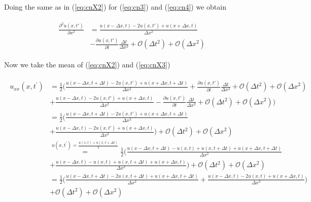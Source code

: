 \documentclass{article}
\begin{document}
Doing the same as in (\ref{eq:cnX2}) for (\ref{eq:cn3}) and (\ref{eq:cn4}) we obtain

\begin{subequations}\label{eq:cnX3}
	\begin{align}
		\begin{split}
			\frac{\partial^2 u(x,t')}{\partial x^2} &=\frac{u(x-\Delta x,t) - 2u(x,t') + u(x+\Delta x, t)}{\Delta x^2}\\
			&- \frac{\partial u(x,t')}{\partial t} \frac{\Delta t}{\Delta x^2} 
			+  \mathcal{O}(\Delta t^2) + \mathcal{O}(\Delta x^2)
		\end{split}
	\end{align}
\end{subequations}

Now we take the mean of (\ref{eq:cnX2}) and (\ref{eq:cnX3}) 

\begin{subequations}
	\begin{align}
		\begin{split}
			u_{xx}(x, t^{'}) &=\frac{1}{2} \Big(\frac{u(x-\Delta x,t+ \Delta t)  - 2u(x,t') +  	u(x+\Delta x, t+\Delta t)}{\Delta x^2} +\frac{\partial u(x,t')}{\partial t} \frac{\Delta t}{\Delta x^2} + \mathcal{O}(\Delta t^2) + \mathcal{O}(\Delta x^2) \\
			&+  \frac{u(x-\Delta x,t) - 2u(x,t') + u(x+\Delta x, t)}{\Delta x^2} -\frac{\partial u(x,t')}{\partial t} \frac{\Delta t}{\Delta x^2} + \mathcal{O}(\Delta t^2)  + \mathcal{O}(\Delta x^2)\Big)\\
			&= \frac{1}{2} \Big(\frac{u(x-\Delta x,t+ \Delta t)  - 2u(x,t') +  	u(x+\Delta x, t+\Delta t)}{\Delta x^2} \\
			& +  \frac{u(x-\Delta x,t) - 2u(x,t') + u(x+\Delta x, t)}{\Delta x^2} \Big) + \mathcal{O}(\Delta t^2) + \mathcal{O}(\Delta x^2)\\
			&\stackrel{u(x,t^{'}) = \frac{u(x,t) + u(x,t+\Delta t)}{2}}{=}
			\frac{1}{2} \Big(\frac{u(x-\Delta x,t+ \Delta t)  - u(x,t) + u(x,t+\Delta t) +  	u(x+\Delta x, t+\Delta t)}{\Delta x^2} \\
			& +  \frac{u(x-\Delta x,t) - u(x,t) + u(x,t+\Delta t) + u(x+\Delta x, t)}{\Delta x^2} \Big) + \mathcal{O}(\Delta t^2) + \mathcal{O}(\Delta x^2)\\
			&= \frac{1}{2} \Big(\frac{u(x-\Delta x,t+ \Delta t) - 2u(x,t+\Delta t) +u(x + \Delta x,t+\Delta t)}{\Delta x^2} + \frac{u(x-\Delta x,t) - 2u(x,t) +u(x+ \Delta x,t)}{\Delta x^2} \Big)\\
			& + \mathcal{O}(\Delta t^2)  + \mathcal{O}(\Delta x^2)\label{eq:cnX4}
			\end{split}
	\end{align}
\end{subequations}
\end{document}
